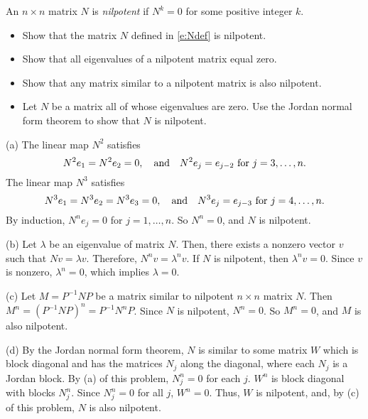 \documentclass{ximera}
\begin{document}
\begin{exercise} \label{c10.5.5}
An $n\times n$ matrix $N$ is 
{\em nilpotent\/} 
if $N^k=0$ for some positive integer $k$.
\begin{itemize}
\item[(a)]  Show that the matrix $N$ defined in \eqref{e:Ndef} is nilpotent.
\item[(b)]  Show that all eigenvalues of a nilpotent matrix equal zero.
\item[(c)]  Show that any matrix similar to a nilpotent matrix is also 
	nilpotent.
\item[(d)]  Let $N$ be a matrix all of whose eigenvalues are zero.  Use 
	the Jordan normal form theorem to show that $N$ is nilpotent.
\end{itemize}

\begin{solution}

(a) The linear map $N^2$ satisfies
\[
N^2e_1 = N^2e_2 = 0, \quad\mbox{and}\quad N^2e_j = e_{j - 2}
\mbox{ for } j = 3,\ldots,n.
\]
The linear map $N^3$ satisfies
\[
N^3e_1 = N^3e_2 = N^3e_3 = 0, \quad\mbox{and}\quad N^3e_j = e_{j - 3} \mbox{ for }
j = 4,\ldots,n.
\]
By induction, $N^ne_j = 0$ for $j = 1,\dots,n$.  So $N^n = 0$, and $N$
is nilpotent.

(b) Let $\lambda$ be an eigenvalue of matrix $N$.  Then, there
exists a nonzero vector $v$ such that $Nv = \lambda v$.  Therefore,
$N^nv = \lambda^nv$.  If $N$ is nilpotent, then $\lambda^nv = 0$.  Since
$v$ is nonzero, $\lambda^n = 0$, which implies $\lambda = 0$.

(c) Let $M = P^{-1}NP$ be a matrix similar to nilpotent $n \times n$
matrix $N$.  Then $M^n = (P^{-1}NP)^n = P^{-1}N^nP$.  Since $N$ is
nilpotent, $N^n = 0$.  So $M^n = 0$, and $M$ is also nilpotent.

(d) By the Jordan normal form theorem, $N$ is similar to some matrix $W$ which
is block diagonal and has the matrices $N_j$ along the diagonal, where each
$N_j$ is a Jordan block.  By (a) of this problem, $N_j^n = 0$ for each
$j$.  $W^n$ is block diagonal with blocks $N_j^n$.  Since $N_j^n = 0$ for all
$j$, $W^n = 0$.  Thus, $W$ is nilpotent, and, by (c) of this problem, $N$
is also nilpotent.

\end{solution}
\end{exercise}
\end{document}
